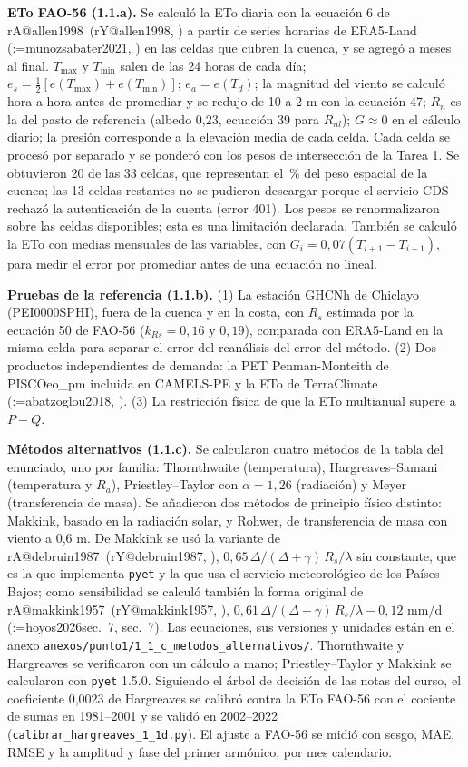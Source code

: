 \documentclass[12pt,a4paper]{article}
\makeatletter
\newcommand{\parencite}[2][]{(\@tempswafalse\@for\rk:=#2\do{\if@tempswa; \fi\@tempswatrue\csname rA@\rk\endcsname, \csname rY@\rk\endcsname}\ifx\relax#1\relax\else, #1\fi)}
\newcommand{\textcite}[2][]{\csname rA@#2\endcsname\ (\csname rY@#2\endcsname\ifx\relax#1\relax\else, #1\fi)}
\makeatother
\begin{document}
\textbf{ETo FAO-56 (1.1.a).} Se calculó la ETo diaria con la ecuación 6 de \textcite{allen1998} a partir de series horarias de ERA5-Land \parencite{munozsabater2021} en las celdas que cubren la cuenca, y se agregó a meses al final. $T_{\max}$ y $T_{\min}$ salen de las 24 horas de cada día; $e_s=\tfrac12[e(T_{\max})+e(T_{\min})]$; $e_a=e(T_d)$; la magnitud del viento se calculó hora a hora antes de promediar y se redujo de 10 a 2 m con la ecuación 47; $R_n$ es la del pasto de referencia (albedo 0,23, ecuación 39 para $R_{nl}$); $G\approx0$ en el cálculo diario; la presión corresponde a la elevación media de cada celda. Cada celda se procesó por separado y se ponderó con los pesos de intersección de la Tarea 1. Se obtuvieron 20 de las 33 celdas, que representan el \CobEra\,\% del peso espacial de la cuenca; las 13 celdas restantes no se pudieron descargar porque el servicio CDS rechazó la autenticación de la cuenta (error 401). Los pesos se renormalizaron sobre las celdas disponibles; esta es una limitación declarada. También se calculó la ETo con medias mensuales de las variables, con $G_i=0{,}07(T_{i+1}-T_{i-1})$, para medir el error por promediar antes de una ecuación no lineal.

\textbf{Pruebas de la referencia (1.1.b).} (1) La estación GHCNh de Chiclayo (PEI0000SPHI), fuera de la cuenca y en la costa, con $R_s$ estimada por la ecuación 50 de FAO-56 ($k_{Rs}=0{,}16$ y $0{,}19$), comparada con ERA5-Land en la misma celda para separar el error del reanálisis del error del método. (2) Dos productos independientes de demanda: la PET Penman-Monteith de PISCOeo\_pm incluida en CAMELS-PE y la ETo de TerraClimate \parencite{abatzoglou2018}. (3) La restricción física de que la ETo multianual supere a $P-Q$.

\textbf{Métodos alternativos (1.1.c).} Se calcularon cuatro métodos de la tabla del enunciado, uno por familia: Thornthwaite (temperatura), Hargreaves--Samani (temperatura y $R_a$), Priestley--Taylor con $\alpha=1{,}26$ (radiación) y Meyer (transferencia de masa). Se añadieron dos métodos de principio físico distinto: Makkink, basado en la radiación solar, y Rohwer, de transferencia de masa con viento a 0,6 m. De Makkink se usó la variante de \textcite{debruin1987}, $0{,}65\,\Delta/(\Delta+\gamma)\,R_s/\lambda$ sin constante, que es la que implementa \texttt{pyet} y la que usa el servicio meteorológico de los Países Bajos; como sensibilidad se calculó también la forma original de \textcite{makkink1957}, $0{,}61\,\Delta/(\Delta+\gamma)\,R_s/\lambda-0{,}12$ mm/d \parencite[sec.~7]{hoyos2026}. Las ecuaciones, sus versiones y unidades están en el anexo \texttt{anexos/punto1/1\_1\_c\_metodos\_alternativos/}. Thornthwaite y Hargreaves se verificaron con un cálculo a mano; Priestley--Taylor y Makkink se calcularon con \texttt{pyet} 1.5.0. Siguiendo el árbol de decisión de las notas del curso, el coeficiente 0,0023 de Hargreaves se calibró contra la ETo FAO-56 con el cociente de sumas en 1981--2001 y se validó en 2002--2022 (\texttt{calibrar\_hargreaves\_1\_1d.py}). El ajuste a FAO-56 se midió con sesgo, MAE, RMSE y la amplitud y fase del primer armónico, por mes calendario.
\end{document}
